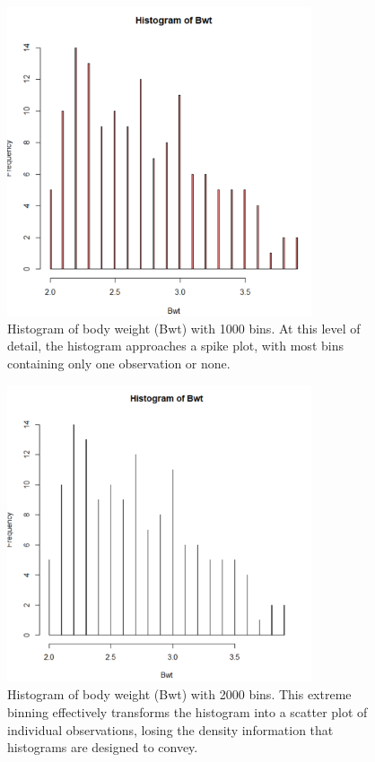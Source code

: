 \documentclass[a4paper,12pt]{article}
\begin{document}
\begin{figure}[H]
    \centering
    \includegraphics[width=0.8\textwidth]{hist1000.png}
    \caption{Histogram of body weight (Bwt) with 1000 bins. At this level of detail, the histogram approaches a spike plot, with most bins containing only one observation or none.}
    \label{fig:hist1000}
\end{figure}

\begin{figure}[H]
    \centering
    \includegraphics[width=0.8\textwidth]{hist2000.png}
    \caption{Histogram of body weight (Bwt) with 2000 bins. This extreme binning effectively transforms the histogram into a scatter plot of individual observations, losing the density information that histograms are designed to convey.}
    \label{fig:hist2000}
\end{figure}
\end{document}
